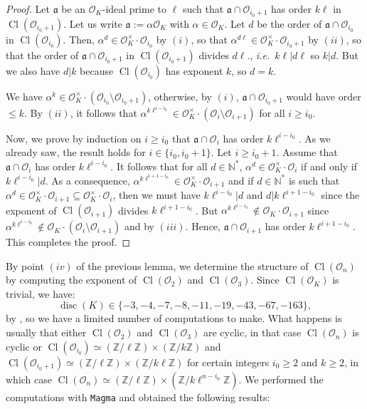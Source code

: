 \documentclass[a4paper,10pt]{report}
\theoremstyle{definition}
\theoremstyle{plain}
\theoremstyle{definition}
\newcommand{\ie}{\emph{i.e.}\ }
\newcommand{\N}{\mathbb{N}}
\newcommand{\Z}{\mathbb{Z}}
\newcommand{\mO}{\mathcal{O}}
\renewcommand{\(}{\left(}
\renewcommand{\)}{\right)}
\newcommand{\mf}[1]{\mathfrak{#1}}
\DeclareMathOperator{\disc}{disc}
\DeclareMathOperator{\Cl}{Cl}
\begin{document}
\begin{proof}
Let $\mf{a}$ be an $\mO_K$-ideal prime to $\ell$ such that $\mf{a}\cap\mO_{i_0+1}$ has order $k\ell$ in $\Cl(\mO_{i_0+1})$.  Let us write $\mf{a}:=\alpha\mO_K$ with $\alpha\in\mO_K$. Let $d$ be the order of $\mf{a}\cap\mO_{i_0}$ in $\Cl(\mO_{i_0})$. Then, $\alpha^{d}\in\mO_K^\times\cdot\mO_{i_0}$ by $(i)$, so that $\alpha^{d\ell}\in\mO_K^\times\cdot\mO_{i_0+1}$ by $(ii)$, so that the order of $\mf{a}\cap\mO_{i_0+1}$ in $\Cl(\mO_{i_0+1})$ divides $d\ell$., \ie $k\ell|d\ell$ so $k|d$. But we also have $d|k$ because $\Cl(\mO_{i_0})$ has exponent $k$, so $d=k$. 

We have $\alpha^k\in\mO_K^\times\cdot(\mO_{i_0}\setminus\mO_{i_0+1})$, otherwise, by $(i)$, $\mf{a}\cap\mO_{i_0+1}$ would have order $\leq k$. By $(ii)$, it follows that $\alpha^{k\ell^{i-i_0}}\in\mO_K^\times\cdot(\mO_{i}\setminus\mO_{i+1})$ for all $i\geq i_0$.

Now, we prove by induction on $i\geq i_0$ that $\mf{a}\cap\mO_i$ has order $k\ell^{i-i_0}$. As we already saw, the result holds for $i\in\{i_0,i_0+1\}$. Let $i\geq i_0+1$. Assume that $\mf{a}\cap\mO_i$ has order $k\ell^{i-i_0}$. It follows that for all $d\in\N^*$, $\alpha^d\in\mO_K^\times\cdot \mO_i$ if and only if $k\ell^{i-i_0}|d$.  As a consequence, $\alpha^{k\ell^{i+1-i_0}}\in\mO_K^\times\cdot \mO_{i+1}$ and if $d\in\N^*$ is such that $\alpha^{d}\in\mO_K^\times\cdot \mO_{i+1}\subseteq \mO_K^\times\cdot \mO_{i}$, then we must have $k\ell^{i-i_0}|d$ and $d|k\ell^{i+1-i_0}$ since the exponent of $\Cl(\mO_{i+1})$ divides $k\ell^{i+1-i_0}$. But $\alpha^{k\ell^{i-i_0}}\not\in\mO_K\cdot\mO_{i+1}$ since $\alpha^{k\ell^{i-i_0}}\not\in\mO_K\cdot(\mO_i\setminus\mO_{i+1})$ and by $(iii)$. Hence, $\mf{a}\cap\mO_{i+1}$ has order $k\ell^{i+1-i_0}$. This completes the proof.

\end{proof}

By point $(iv)$ of the previous lemma, we determine the structure of $\Cl(\mO_n)$ by computing the exponent of $\Cl(\mO_2)$ and $\Cl(\mO_3)$. Since $\Cl(\mO_K)$ is trivial, we have:
\[\disc(K)\in\{-3,-4,-7,-8,-11,-19,-43,-67,-163\},\]
by \cite[Theorem 7.30.(i)]{Cox}, so we have a limited number of computations to make. What happens is usually that either $\Cl(\mO_{2})$ and $\Cl(\mO_{3})$ are cyclic, in that case $\Cl(\mO_n)$ is cyclic or $\Cl(\mO_{i_0})\simeq(\Z/\ell\Z)\times(\Z/k\Z)$ and $\Cl(\mO_{i_0+1})\simeq(\Z/\ell\Z)\times(\Z/k\ell\Z)$ for certain integers $i_0\geq 2$ and $k\geq 2$, in which case $\Cl(\mO_n)\simeq(\Z/\ell\Z)\times(\Z/k\ell^{n-i_0}\Z)$.  We performed the computations with \verb?Magma? \cite{Magma} and obtained the following results:
\end{document}
